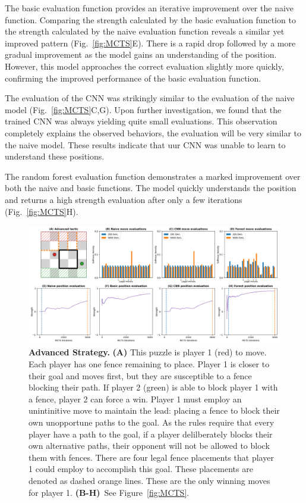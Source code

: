 \documentclass[10pt]{article}
\begin{document}
The basic evaluation function provides an iterative improvement over the naive function. Comparing the strength calculated by the basic evaluation function to the strength calculated by the naive evaluation function reveals a similar yet improved pattern (Fig.~\ref{fig:MCTS}E). There is a rapid drop followed by a more gradual improvement as the model gains an understanding of the position. However, this model approaches the correct evaluation slightly more quickly, confirming the improved performance of the basic evaluation function.

The evaluation of the CNN was strikingly similar to the evaluation of the naive model (Fig.~\ref{fig:MCTS}C,G). Upon further investigation, we found that the trained CNN was always yielding quite small evaluations. This observation completely explains the observed behaviors, the evaluation will be very similar to the naive model. These results indicate that uur CNN was unable to learn to understand these positions.


The random forest evaluation function demonstrates a marked improvement over both the naive and basic functions. The model quickly understands the position and returns a high strength evaluation after only a few iterations (Fig.~\ref{fig:MCTS}H).


\begin{figure}[H]
    \centering
    \includegraphics[width=\linewidth]{Adv_tactic.png}
    \caption{\textbf{Advanced Strategy.} \textbf{(A)} This puzzle is player 1 (red) to move. Each player has one fence remaining to place. Player 1 is closer to their goal and moves first, but they are susceptible to a fence blocking their path. If player 2 (green) is able to block player 1 with a fence, player 2 can force a win. Player 1 must employ an unintinitive move to maintain the lead: placing a fence to block their own unopportune paths to the goal. As the rules require that every player have a path to the goal, if a player delilberately blocks their own alternative paths, their opponent will not be allowed to block them with fences. There are four legal fence placements that player 1 could employ to accomplish this goal. These placements are denoted as dashed orange lines. These are the only winning moves for player 1. \textbf{(B-H)}~See Figure~\ref{fig:MCTS}.}
    \label{fig:AdvTactic}
\end{figure}
\end{document}
